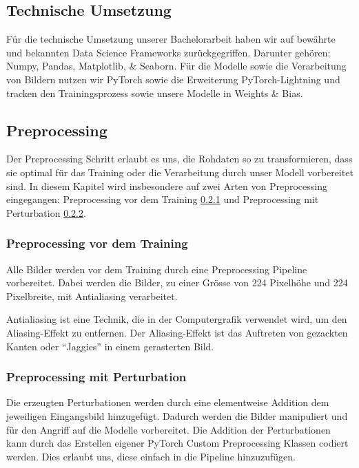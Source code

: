 \subsection{Technische Umsetzung}

Für die technische Umsetzung unserer Bachelorarbeit haben wir auf bewährte und bekannten Data Science Frameworks zurückgegriffen. Darunter gehören: Numpy, Pandas, Matplotlib, \& Seaborn. Für die Modelle sowie die Verarbeitung von Bildern nutzen wir PyTorch sowie die Erweiterung PyTorch-Lightning und tracken den Trainingsprozess sowie unsere Modelle in Weights \& Bias.

\subsection{Preprocessing}  \label{chap:preprocessing}

Der Preprocessing Schritt erlaubt es uns, die Rohdaten so zu transformieren, dass sie optimal für das Training oder die Verarbeitung durch unser Modell vorbereitet sind. In diesem Kapitel wird insbesondere auf zwei Arten von Preprocessing eingegangen: Preprocessing vor dem Training \ref{chap:Preprocessing vor dem Training} und Preprocessing mit Perturbation \ref{chap:Preprocessing mit Perturbation}.

\subsubsection{Preprocessing vor dem Training} \label{chap:Preprocessing vor dem Training}

Alle Bilder werden vor dem Training durch eine Preprocessing Pipeline vorbereitet. Dabei werden die Bilder, zu einer Grösse von 224 Pixelhöhe und 224 Pixelbreite, mit Antialiasing verarbeitet. 

Antialiasing ist eine Technik, die in der Computergrafik verwendet wird, um den Aliasing-Effekt zu entfernen. Der Aliasing-Effekt ist das Auftreten von gezackten Kanten oder "`Jaggies"' in einem gerasterten Bild.

\subsubsection{Preprocessing mit Perturbation} \label{chap:Preprocessing mit Perturbation}

Die erzeugten Perturbationen werden durch eine elementweise Addition dem jeweiligen Eingangsbild hinzugefügt. Dadurch werden die Bilder manipuliert und für den Angriff auf die Modelle vorbereitet. Die Addition der Perturbationen kann durch das Erstellen eigener PyTorch Custom Preprocessing Klassen codiert werden. Dies erlaubt uns, diese einfach in die Pipeline hinzuzufügen. 



